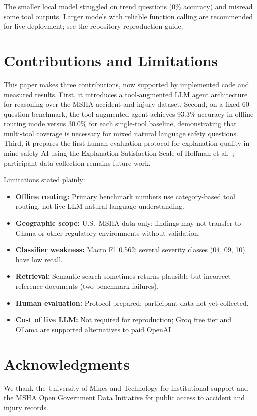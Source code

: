 \documentclass[11pt,a4paper]{article}
\begin{document}
The smaller local model struggled on trend questions (0\% accuracy) and
misread some tool outputs. Larger models with reliable function calling are
recommended for live deployment; see the repository reproduction guide.

\section{Contributions and Limitations}
\label{sec:discussion}

This paper makes three contributions, now supported by implemented code and
measured results. First, it introduces a tool-augmented LLM agent architecture
for reasoning over the MSHA accident and injury dataset. Second, on a fixed
60-question benchmark, the tool-augmented agent achieves 93.3\% accuracy in
offline routing mode versus 30.0\% for each single-tool baseline, demonstrating
that multi-tool coverage is necessary for mixed natural language safety
questions. Third, it prepares the first human evaluation protocol for
explanation quality in mine safety AI using the Explanation Satisfaction Scale
of Hoffman et al.~\cite{Hoffman2023}; participant data collection remains
future work.

Limitations stated plainly:
\begin{itemize}
  \item \textbf{Offline routing:} Primary benchmark numbers use category-based
    tool routing, not live LLM natural language understanding.
  \item \textbf{Geographic scope:} U.S.\ MSHA data only; findings may not transfer
    to Ghana or other regulatory environments without validation.
  \item \textbf{Classifier weakness:} Macro F1 0.562; several severity classes
    (04, 09, 10) have low recall.
  \item \textbf{Retrieval:} Semantic search sometimes returns plausible but
    incorrect reference documents (two benchmark failures).
  \item \textbf{Human evaluation:} Protocol prepared; participant data not yet
    collected.
  \item \textbf{Cost of live LLM:} Not required for reproduction; Groq free tier
    and Ollama are supported alternatives to paid OpenAI.
\end{itemize}

\section*{Acknowledgments}

We thank the University of Mines and Technology for institutional support and
the MSHA Open Government Data Initiative for public access to accident and
injury records.



\end{document}
